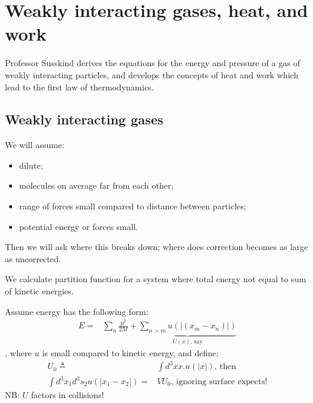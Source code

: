 \documentclass[]{article}
\begin{document}
\section{Weakly interacting gases, heat, and work}

Professor Susskind derives the equations for the energy and pressure of a gas of weakly interacting particles, and develops the concepts of heat and work which lead to the first law of thermodynamics.

\subsection{Weakly interacting gases}

We will assume:
\begin{itemize}
	\item dilute;
	\item molecules on average far from each other;
	\item range of forces small compared to distance between particles;
	\item potential energy or forces small.
\end{itemize}

Then we will ask where this breaks down; where does correction becomes as large as uncorrected. 

We calculate partition function for a system where total energy not equal to sum of kinetic energies.

Assume energy has the following form:
\begin{align*}
E =& \sum_{n} \frac{p^2}{2M} + \underbrace{\sum_{n>m}u(\vert(x_m-x_n)\vert)}_{U(x)\text{, say}}
\end{align*}
, where $u$ is small compared to kinetic energy, and define:
\begin{align*}
U_0 \triangleq& \int d^3x x.u(\vert x \vert)\text{, then}\\
\int d^3x_1 d^3s_2 u(\vert x_1 - x_2\vert) = & V U_0\text{, ignoring surface expects!}
\end{align*}
NB: $U$ factors in collisions!
\end{document}
